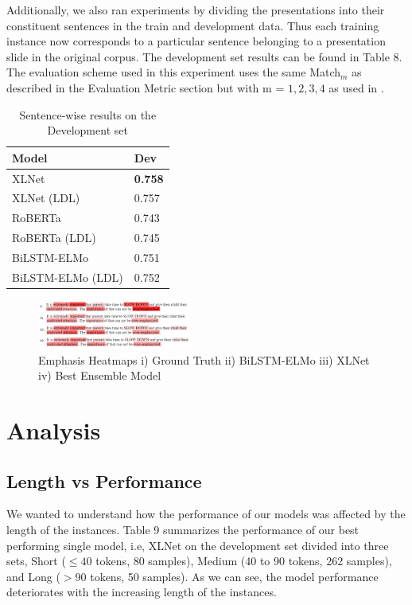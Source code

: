 \documentclass[letterpaper]{article}
\begin{document}
Additionally, we also ran experiments by dividing the presentations into their constituent sentences in the train and development data. Thus each training instance now corresponds to a particular sentence belonging to a presentation slide in the original corpus. The development set results can be found in Table 8. The evaluation scheme used in this experiment uses the same Match$_m$ as described in the Evaluation Metric section but with  m = \(1,2,3,4\) as used in \citet{shirani2020let}.
\begin{table}[h!]
\centering
\begin{adjustbox}{width=0.47\columnwidth}
\begin{tabular}{|l|l|}
\hline
\textbf{Model} & \textbf{Dev} \\
\hline
XLNet & \textbf{0.758} \\
\hline
XLNet (LDL) & 0.757 \\
\hline
RoBERTa & 0.743 \\
\hline
RoBERTa (LDL) & 0.745 \\
\hline

BiLSTM-ELMo & 0.751 \\
\hline
BiLSTM-ELMo (LDL) & 0.752 \\
\hline

\end{tabular}
\end{adjustbox}
\caption{Sentence-wise results on the Development set}
\label{table:7}
\end{table}


\begin{figure}[h!]
\centering
\includegraphics[width=0.45\textwidth]{results_ex.png}
\caption{Emphasis Heatmaps i) Ground Truth ii) BiLSTM-ELMo iii) XLNet iv) Best Ensemble Model}
\label{result_ex}
\end{figure}

\section{Analysis}
\subsection{Length vs Performance}
We wanted to understand how the performance of our models was affected by the length of the instances. Table 9 summarizes the performance of our best performing single model, i.e, XLNet on the development set divided into three sets, Short ($\leq40$ tokens, 80 samples), Medium (40 to 90 tokens, 262 samples), and Long ($>$90 tokens, 50 samples). As we can see, the model performance  deteriorates with the increasing length of the instances.
\end{document}
